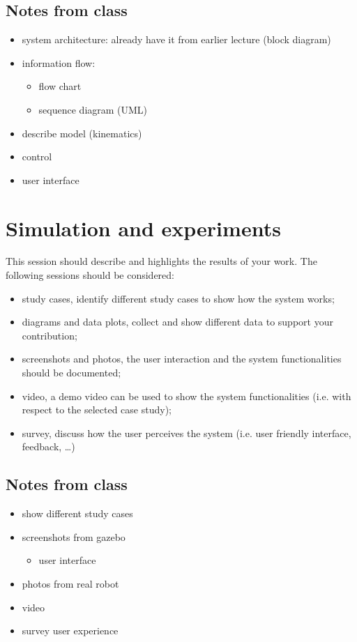 \documentclass[11pt,a4paper]{report}
\begin{document}
	\subsection{Notes from class}
	
	\begin{itemize}
		\item system architecture: already have it from earlier lecture (block diagram)
		\item information flow:
		\begin{itemize}
			\item flow chart
			\item sequence diagram (UML)
		\end{itemize}
		\item describe model (kinematics)
		\item control
		\item user interface
	\end{itemize}
	
	
	
	\section{Simulation and experiments}
	This session should describe and highlights the results of your work. The following sessions should be considered:
	\begin{itemize}
		\item study cases, identify different study cases to show how the system works;
		\item diagrams and data plots, collect and show different data to support your contribution;
		\item screenshots and photos, the user interaction and the system functionalities should be documented;
		\item video, a demo video can be used to show the system functionalities (i.e. with respect to the selected case study);
		\item survey, discuss how the user perceives the system (i.e. user friendly interface, feedback, …)
	\end{itemize}
	
	\subsection{Notes from class}
	
	\begin{itemize}
		\item show different study cases
		\item screenshots from gazebo
		\begin{itemize}
			\item user interface
		\end{itemize}
		\item photos from real robot
		\item video
		\item survey user experience
	\end{itemize}
	
\end{document}

